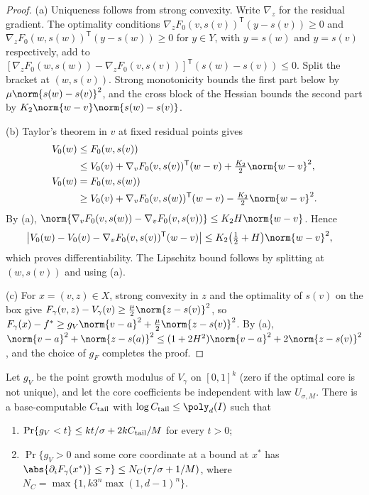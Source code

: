 \begin{proof}
(a) Uniqueness follows from strong convexity. Write $\nabla_z$ for the
residual gradient. The optimality conditions
$\nabla_zF_0(v,s(v))^{\mathsf T}(y-s(v))\ge0$ and
$\nabla_zF_0(w,s(w))^{\mathsf T}(y-s(w))\ge0$ for $y\in Y$, with $y=s(w)$ and
$y=s(v)$ respectively, add to
$[\nabla_zF_0(w,s(w))-\nabla_zF_0(v,s(v))]^{\mathsf T}(s(w)-s(v))\le0$. Split
the bracket at $(w,s(v))$. Strong monotonicity bounds the first part below by
$\mu\norm{s(w)-s(v)}^2$, and the cross block of the Hessian bounds the second
part by $K_2\norm{w-v}\norm{s(w)-s(v)}$.

(b) Taylor's theorem in $v$ at fixed residual points gives
\begin{align*}
 V_0(w)&\le F_0(w,s(v))\\
 &\le V_0(v)+\nabla_vF_0(v,s(v))^{\mathsf T}(w-v)+\tfrac{K_2}2\norm{w-v}^2,\\
 V_0(w)&=F_0(w,s(w))\\
 &\ge V_0(v)+\nabla_vF_0(v,s(w))^{\mathsf T}(w-v)-\tfrac{K_2}2\norm{w-v}^2 .
\end{align*}
By (a), $\norm{\nabla_vF_0(v,s(w))-\nabla_vF_0(v,s(v))}\le K_2H\norm{w-v}$.
Hence
\begin{align*}
 \bigl\lvert V_0(w)-V_0(v)-\nabla_vF_0(v,s(v))^{\mathsf T}(w-v)\bigr\rvert
 &\le K_2\bigl(\tfrac12+H\bigr)\norm{w-v}^2,
\end{align*}
which proves differentiability. The Lipschitz
bound follows by splitting at $(w,s(v))$ and using (a).

(c) For $x=(v,z)\in X$, strong convexity in $z$ and the optimality of
$s(v)$ on the box give $F_\gamma(v,z)-V_\gamma(v)\ge\frac\mu2\norm{z-s(v)}^2$,
so $F_\gamma(x)-f^*\ge g_V\norm{v-a}^2+\frac\mu2\norm{z-s(v)}^2$. By (a),
$\norm{v-a}^2+\norm{z-s(a)}^2\le(1+2H^2)\norm{v-a}^2+2\norm{z-s(v)}^2$, and
the choice of $g_F$ completes the proof.
\end{proof}

\begin{lemma}\label{lem:app:rec:core-tails}
Let $g_V$ be the point growth modulus of $V_\gamma$ on $[0,1]^k$ (zero if the
optimal core is not unique), and let the core coefficients be independent with
law $U_{\sigma,M}$. There is a base-computable $C_{\rm tail}$ with
$\log C_{\rm tail}\le\poly_d(I)$ such that
\begin{enumerate}[label=(\alph*)]
\item $\Pr\{g_V<t\}\le kt/\sigma+2kC_{\rm tail}/M$ for every $t>0$;
\item $\Pr\{g_V>0$ and some core coordinate at a bound at $x^*$ has
$\abs{\partial_iF_\gamma(x^*)}\le\tau\}\le N_C(\tau/\sigma+1/M)$, where
$N_C=\max\{1,k3^n\max(1,d-1)^n\}$.
\end{enumerate}
\end{lemma}

